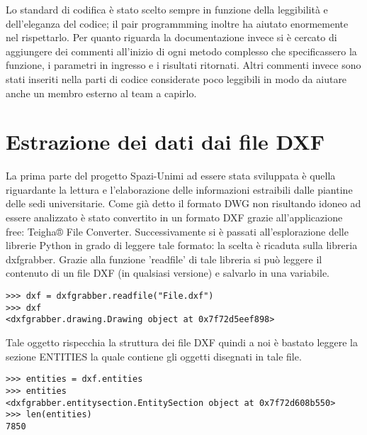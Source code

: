 \documentclass[12pt]{report}
\begin{document}
Lo standard di codifica è stato scelto sempre in funzione della leggibilità e dell'eleganza del codice; il pair programmming inoltre ha aiutato enormemente nel rispettarlo. Per quanto riguarda la documentazione invece si è cercato di aggiungere dei commenti all'inizio di ogni metodo complesso che specificassero la funzione, i parametri in ingresso e i risultati ritornati. Altri commenti invece sono stati inseriti nella parti di codice considerate poco leggibili in modo da aiutare anche un membro esterno al team a capirlo.   

\newpage
\section{Estrazione dei dati dai file DXF}

La prima parte del progetto Spazi-Unimi ad essere stata sviluppata è quella riguardante la lettura e l'elaborazione delle informazioni estraibili dalle piantine delle sedi universitarie. Come già detto il formato DWG non risultando idoneo ad essere analizzato è stato convertito in un formato DXF grazie all'applicazione free: Teigha® File Converter. 
Successivamente si è passati all'esplorazione delle librerie Python in grado di leggere tale formato: la scelta è ricaduta sulla libreria dxfgrabber. Grazie alla funzione 'readfile' di tale libreria si può leggere il contenuto di un file DXF (in qualsiasi versione) e salvarlo in una variabile.
\begin{lstlisting}[label=codice,caption=Lettura di un file DXF con dxfgrabber, frame=single]
>>> dxf = dxfgrabber.readfile("File.dxf")
>>> dxf
<dxfgrabber.drawing.Drawing object at 0x7f72d5eef898>
\end{lstlisting}

Tale oggetto rispecchia la struttura dei file DXF quindi a noi è bastato leggere la sezione ENTITIES la quale contiene gli oggetti disegnati in tale file.
\begin{lstlisting}[label=codice,caption=Salvataggio delle entità di un file DXF, frame=single]
>>> entities = dxf.entities
>>> entities
<dxfgrabber.entitysection.EntitySection object at 0x7f72d608b550>
>>> len(entities)
7850
\end{lstlisting}
\end{document}
